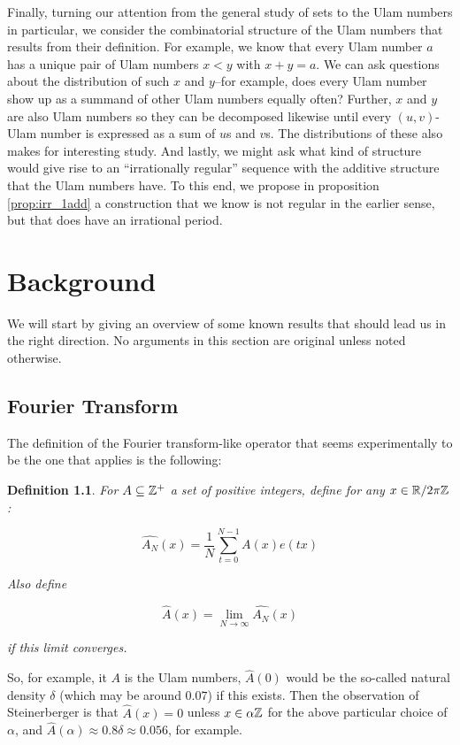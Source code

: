 \documentclass{report}
\newtheorem{definition}[theorem]{Definition}
\theoremstyle{remark}
\numberwithin{equation}{section}
\begin{document}
Finally, turning our attention from the general study of \relevant
sets to the Ulam numbers in particular, we consider the combinatorial
structure of the Ulam numbers that results from their definition.  For
example, we know that every Ulam number $a$ has a unique pair of Ulam
numbers $x < y$ with $x + y = a$.  We can ask questions about the
distribution of such $x$ and $y$--for example, does every Ulam number
show up as a summand of other Ulam numbers equally often?  Further,
$x$ and $y$ are also Ulam numbers so they can be decomposed likewise
until every $(u,v)$-Ulam number is expressed as a sum of $u$s and
$v$s.  The distributions of these also makes for interesting study.
And lastly, we might ask what kind of structure would give rise to an
``irrationally regular'' sequence with the additive structure that the
Ulam numbers have.  To this end, we propose in proposition
\ref{prop:irr_1add} a construction that we know is not regular in the
earlier sense, but that does have an irrational period.

\chapter{Background}

We will start by giving an overview of some known results that should
lead us in the right direction.  No arguments in this section are
original unless noted otherwise.

\section{Fourier Transform}

The definition of the Fourier transform-like operator that seems
experimentally to be the one that applies is the following:

\begin{definition}\label{def:fourier}
For $A \subseteq \mathbb{Z}^+$ a set of positive integers, define for any
$x\in \mathbb{R}/2\pi\mathbb{Z}$: 

\[\widehat{A_N}(x) = \frac{1}{N} \sum_{t=0}^{N-1} A(x) e(tx)\]

Also define 

\[\widehat{A}(x) = \lim_{N \to \infty} \widehat{A_N}(x)\]

if this limit converges.  
\end{definition}

So, for example, it $A$ is the Ulam numbers, $\widehat{A}(0)$ would be
the so-called natural density $\delta$ (which may be around $0.07$) if
this exists.  Then the observation of Steinerberger is that
$\widehat{A}(x) = 0$ unless $x \in \alpha\mathbb{Z}$ for the above particular
choice of $\alpha$, and
$\widehat{A}(\alpha) \approx 0.8\delta \approx 0.056$, for example.
\end{document}
